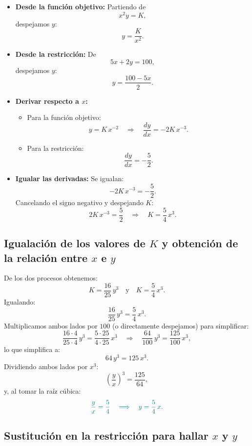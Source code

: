 \documentclass{article}
\begin{document}
\begin{itemize}
    \item \textbf{Desde la función objetivo:}  
    Partiendo de
    \[
    x^2y=K,
    \]
    despejamos \(y\):
    \[
    y=\frac{K}{x^2}.
    \]
    
    \item \textbf{Desde la restricción:}  
    De
    \[
    5x+2y=100,
    \]
    despejamos \(y\):
    \[
    y=\frac{100-5x}{2}.
    \]
    
    \item \textbf{Derivar respecto a \(x\):}
    \begin{itemize}
        \item Para la función objetivo:
        \[
        y=K\,x^{-2}\quad\Longrightarrow\quad \frac{dy}{dx}=-2K\,x^{-3}.
        \]
        \item Para la restricción:
        \[
        \frac{dy}{dx}=-\frac{5}{2}.
        \]
    \end{itemize}
    
    \item \textbf{Igualar las derivadas:}  
    Se igualan:
    \[
    -2K\,x^{-3}=-\frac{5}{2}.
    \]
    Cancelando el signo negativo y despejando \(K\):
    \[
    2K\,x^{-3}=\frac{5}{2} \quad\Longrightarrow\quad K=\frac{5}{4}\,x^3.
    \]
\end{itemize}

\subsection*{Igualación de los valores de \(K\) y obtención de la relación entre \(x\) e \(y\)}

De los dos procesos obtenemos:
\[
K=\frac{16}{25}\,y^3 \quad \text{y} \quad K=\frac{5}{4}\,x^3.
\]
Igualando:
\[
\frac{16}{25}\,y^3=\frac{5}{4}\,x^3.
\]
Multiplicamos ambos lados por \(100\) (o directamente despejamos) para simplificar:
\[
\frac{16\cdot 4}{25\cdot 4}\,y^3=\frac{5\cdot 25}{4\cdot 25}\,x^3 \quad\Longrightarrow\quad \frac{64}{100}\,y^3=\frac{125}{100}\,x^3,
\]
lo que simplifica a:
\[
64\,y^3=125\,x^3.
\]
Dividiendo ambos lados por \(x^3\):
\[
\left(\frac{y}{x}\right)^3=\frac{125}{64},
\]
y, al tomar la raíz cúbica:
\[
\color{teal}\frac{y}{x}=\frac{5}{4} \quad\Longrightarrow\quad y=\frac{5}{4}\,x.
\]

\subsection*{Sustitución en la restricción para hallar \(x\) y \(y\)}
\end{document}
